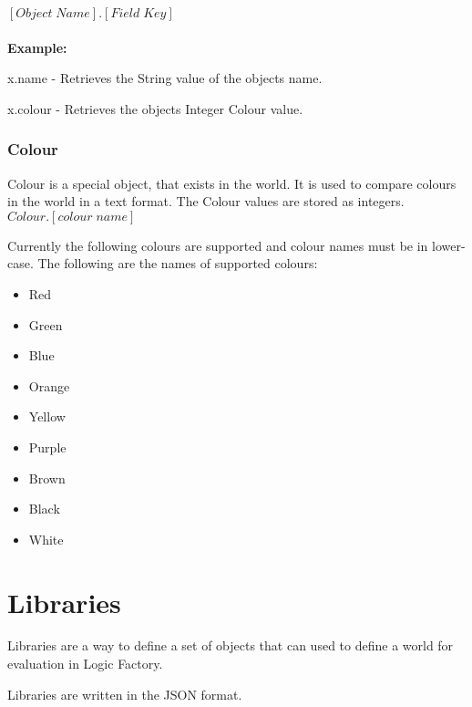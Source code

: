 \documentclass{article}
\begin{document}
	$[Object\;Name].[Field\;Key]$ \\ \\
	\textbf{Example:}

	x.name - Retrieves the String value of the objects name.
	
	x.colour - Retrieves the objects Integer Colour value.
	
	
	
	
	\subsubsection*{Colour}
	Colour is a special object, that exists in the world. It is used to compare colours in the world in a text format. The Colour values are stored as integers.\\
	
	$Colour.[colour\; name]$
	
	Currently the following colours are supported and colour names must be in lower-case.
	The following are the names of supported colours:
	
	\noindent\parbox[t]{2.4in}{\raggedright%
		\begin{itemize}\itemsep1pt \parskip0pt 
			\item Red
			\item Green
			\item Blue
			\item Orange
			\item Yellow
		\end{itemize}
		
	}%
	\parbox[t]{2.4in}{\raggedright%
		\begin{itemize}\itemsep1pt \parskip0pt 
			
			\item Purple
			\item Brown
			\item Black
			\item White
		\end{itemize}
	}

	\section{Libraries}
	
	Libraries are a way to define a set of objects that can used to define a world for evaluation in Logic Factory.
	
	Libraries are written in the JSON format.
		
\end{document}
